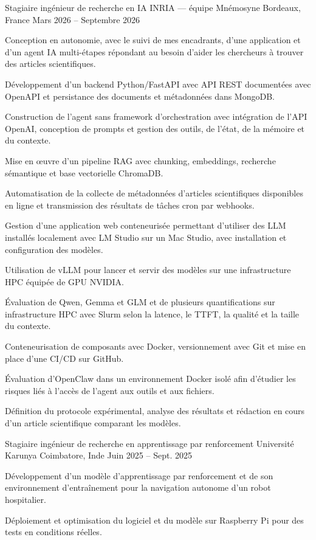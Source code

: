 
\begin{cventries}
  \cventry
    {Stagiaire ingénieur de recherche en IA}
    {INRIA — équipe Mnémosyne}
    {Bordeaux, France}
    {Mars 2026 -- Septembre 2026}
    {
      \begin{cvitems}
        \item {Conception en autonomie, avec le suivi de mes encadrants, d’une application et d’un agent IA multi-étapes répondant au besoin d’aider les chercheurs à trouver des articles scientifiques.}
        \item {Développement d’un backend Python/FastAPI avec API REST documentées avec OpenAPI et persistance des documents et métadonnées dans MongoDB.}
        \item {Construction de l’agent sans framework d’orchestration avec intégration de l’API OpenAI, conception de prompts et gestion des outils, de l’état, de la mémoire et du contexte.}
        \item {Mise en œuvre d’un pipeline RAG avec chunking, embeddings, recherche sémantique et base vectorielle ChromaDB.}
        \item {Automatisation de la collecte de métadonnées d’articles scientifiques disponibles en ligne et transmission des résultats de tâches cron par webhooks.}
        \item {Gestion d’une application web conteneurisée permettant d’utiliser des LLM installés localement avec LM Studio sur un Mac Studio, avec installation et configuration des modèles.}
        \item {Utilisation de vLLM pour lancer et servir des modèles sur une infrastructure HPC équipée de GPU NVIDIA.}
        \item {Évaluation de Qwen, Gemma et GLM et de plusieurs quantifications sur infrastructure HPC avec Slurm selon la latence, le TTFT, la qualité et la taille du contexte.}
        \item {Conteneurisation de composants avec Docker, versionnement avec Git et mise en place d’une CI/CD sur GitHub.}
        \item {Évaluation d’OpenClaw dans un environnement Docker isolé afin d’étudier les risques liés à l’accès de l’agent aux outils et aux fichiers.}
        \item {Définition du protocole expérimental, analyse des résultats et rédaction en cours d’un article scientifique comparant les modèles.}
      \end{cvitems}
    }

  \cventry
    {Stagiaire ingénieur de recherche en apprentissage par renforcement}
    {Université Karunya}
    {Coimbatore, Inde}
    {Juin 2025 -- Sept. 2025}
    {
      \begin{cvitems}
        \item {Développement d’un modèle d’apprentissage par renforcement et de son environnement d’entraînement pour la navigation autonome d’un robot hospitalier.}
        \item {Déploiement et optimisation du logiciel et du modèle sur Raspberry Pi pour des tests en conditions réelles.}
      \end{cvitems}
    }
\end{cventries}
